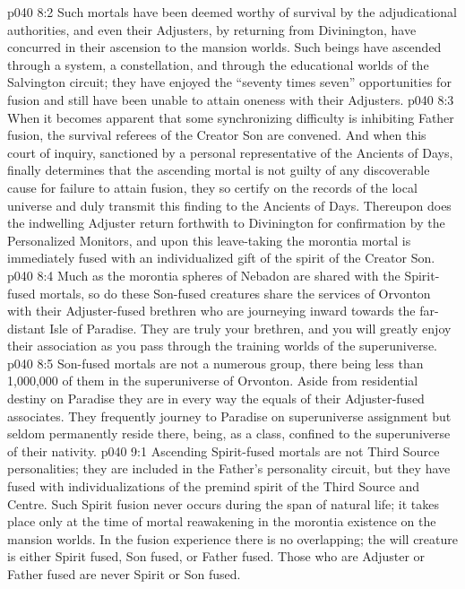 \vs p040 8:2 Such mortals have been deemed worthy of survival by the adjudicational authorities, and even their Adjusters, by returning from Divinington, have concurred in their ascension to the mansion worlds. Such beings have ascended through a system, a constellation, and through the educational worlds of the Salvington circuit; they have enjoyed the “seventy times seven” opportunities for fusion and still have been unable to attain oneness with their Adjusters.
\vs p040 8:3 When it becomes apparent that some synchronizing difficulty is inhibiting Father fusion, the survival referees of the Creator Son are convened. And when this court of inquiry, sanctioned by a personal representative of the Ancients of Days, finally determines that the ascending mortal is not guilty of any discoverable cause for failure to attain fusion, they so certify on the records of the local universe and duly transmit this finding to the Ancients of Days. Thereupon does the indwelling Adjuster return forthwith to Divinington for confirmation by the Personalized Monitors, and upon this leave\hyp{}taking the morontia mortal is immediately fused with an individualized gift of the spirit of the Creator Son.
\vs p040 8:4 \pc Much as the morontia spheres of Nebadon are shared with the Spirit\hyp{}fused mortals, so do these Son\hyp{}fused creatures share the services of Orvonton with their Adjuster\hyp{}fused brethren who are journeying inward towards the far\hyp{}distant Isle of Paradise. They are truly your brethren, and you will greatly enjoy their association as you pass through the training worlds of the superuniverse.
\vs p040 8:5 Son\hyp{}fused mortals are not a numerous group, there being less than 1,000,000 of them in the superuniverse of Orvonton. Aside from residential destiny on Paradise they are in every way the equals of their Adjuster\hyp{}fused associates. They frequently journey to Paradise on superuniverse assignment but seldom permanently reside there, being, as a class, confined to the superuniverse of their nativity.
\vs p040 9:1 Ascending Spirit\hyp{}fused mortals are not Third Source personalities; they are included in the Father’s personality circuit, but they have fused with individualizations of the premind spirit of the Third Source and Centre. Such Spirit fusion never occurs during the span of natural life; it takes place only at the time of mortal reawakening in the morontia existence on the mansion worlds. In the fusion experience there is no overlapping; the will creature is either Spirit fused, Son fused, or Father fused. Those who are Adjuster or Father fused are never Spirit or Son fused.
